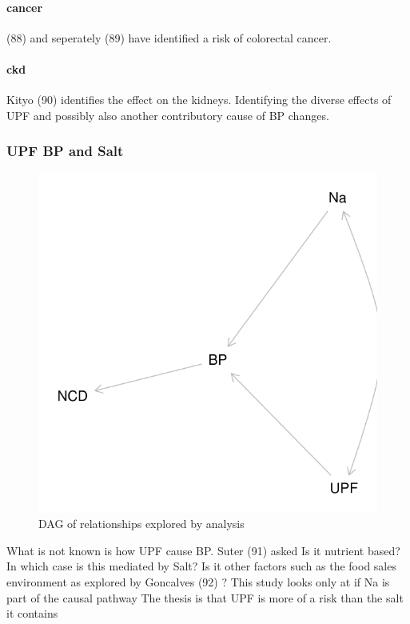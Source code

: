 \documentclass[
]{article}
\begin{document}
\hypertarget{cancer}{%
\paragraph{cancer}\label{cancer}}

(88) and seperately (89) have identified a risk of colorectal cancer.

\hypertarget{ckd}{%
\paragraph{ckd}\label{ckd}}

Kityo (90) identifies the effect on the kidneys. Identifying the diverse
effects of UPF and possibly also another contributory cause of BP
changes.

\hypertarget{upf-bp-and-salt}{%
\subsubsection{UPF BP and Salt}\label{upf-bp-and-salt}}

\begin{figure}
\centering
\includegraphics{nextlevel_files/figure-latex/fig-dagupfbp-1.pdf}
\caption{DAG of relationships explored by analysis}
\end{figure}

What is not known is how UPF cause BP. Suter (91) asked Is it nutrient
based? In which case is this mediated by Salt? Is it other factors such
as the food sales environment as explored by Goncalves (92) ? This study
looks only at if Na is part of the causal pathway The thesis is that UPF
is more of a risk than the salt it contains
\end{document}
